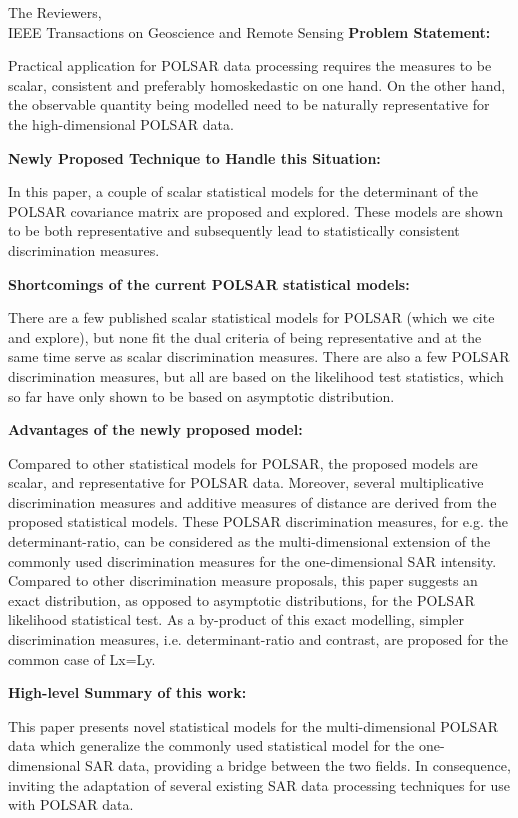 \documentclass{letter}
\begin{document}
\begin{letter}{The Reviewers,\\IEEE Transactions on Geoscience and Remote Sensing}
\textbf{Problem Statement:}

Practical application for POLSAR data processing requires the measures to be scalar, consistent and preferably homoskedastic on one hand.
On the other hand, the observable quantity being modelled need to be naturally representative for the high-dimensional POLSAR data.

\textbf{Newly Proposed Technique to Handle this Situation:}

In this paper, a couple of scalar statistical models for the determinant of the POLSAR covariance matrix are proposed and explored.
These models are shown to be both representative and subsequently lead to statistically consistent discrimination measures.

\textbf{Shortcomings of the current POLSAR statistical models:}

There are a few published scalar statistical models for POLSAR (which we cite and explore), but none fit the dual criteria of being representative and at the same time serve as scalar discrimination measures.
There are also a few POLSAR discrimination measures, but all are based on the likelihood test statistics, which so far have only shown to be based on asymptotic distribution.

\textbf{Advantages of the newly proposed model:}

Compared to other statistical models for POLSAR, the proposed models are scalar, and representative for POLSAR data.
Moreover, several multiplicative discrimination measures and additive measures of distance are derived from the proposed statistical models.
These POLSAR discrimination measures, for e.g. the determinant-ratio, can be considered as the multi-dimensional extension of the commonly used discrimination measures for the one-dimensional SAR intensity.
Compared to other discrimination measure proposals, this paper suggests an exact distribution, as opposed to asymptotic distributions, for the POLSAR likelihood statistical test.
As a by-product of this exact modelling, simpler discrimination measures, i.e. determinant-ratio and contrast, are proposed for the common case of Lx=Ly.

\textbf{High-level Summary of this work:}

This paper presents novel statistical models for the multi-dimensional POLSAR data which generalize the commonly used statistical model for the one-dimensional SAR data, providing a bridge between the two fields. In consequence, inviting the adaptation of several existing SAR data processing techniques for use with POLSAR data.

\end{letter}
 
\end{document}
